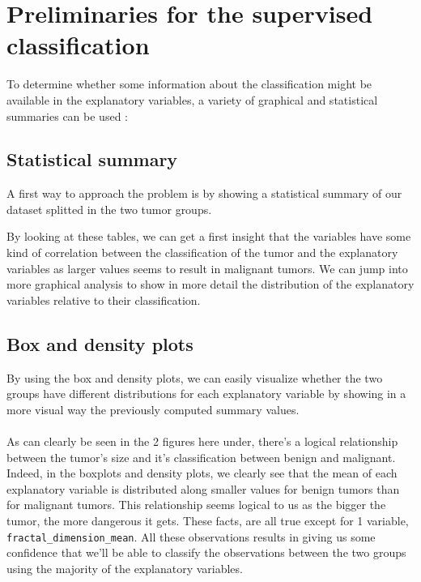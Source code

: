 \section{Preliminaries for the supervised classification}

To determine whether some information about the classification might be available in the explanatory variables, a variety of graphical and statistical summaries can be used : 

\subsection{Statistical summary}
A first way to approach the problem is by showing a statistical summary of our dataset splitted in the two tumor groups.




By looking at these tables, we can get a first insight that the variables have some kind of correlation between the classification of the tumor and the explanatory variables as larger values seems to result in malignant tumors. We can jump into more graphical analysis to show in more detail the distribution of the explanatory variables relative to their classification.

\subsection{Box and density plots}
By using the box and density plots, we can easily visualize whether the two groups have different distributions for each explanatory variable by showing in a more visual way the previously computed summary values.
\\\\
As can clearly be seen in the 2 figures here under, there's a logical relationship between the tumor's size and it's classification between benign and malignant. Indeed, in the boxplots and density plots, we clearly see that the mean of each explanatory variable is distributed along smaller values for benign tumors than for malignant tumors. This relationship seems logical to us as the bigger the tumor, the more dangerous it gets. These facts, are all true except for 1 variable, \verb|fractal_dimension_mean|. All these observations results in giving us some confidence that we'll be able to classify the observations between the two groups using the majority of the explanatory variables.

